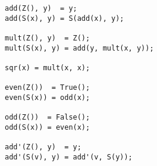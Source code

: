 \begin{lstlisting}[language=sll]
add(Z(), y)  = y;
add(S(x), y) = S(add(x), y);

mult(Z(), y)  = Z();
mult(S(x), y) = add(y, mult(x, y));

sqr(x) = mult(x, x);

even(Z())  = True();
even(S(x)) = odd(x);

odd(Z())  = False();
odd(S(x)) = even(x);

add'(Z(), y)  = y;
add'(S(v), y) = add'(v, S(y));
\end{lstlisting}